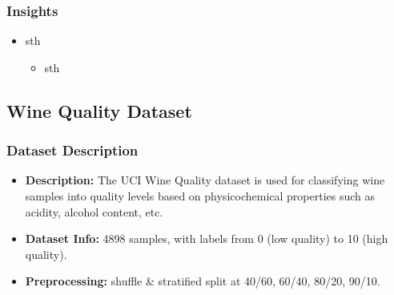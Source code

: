 \clearpage
\subsubsection*{Insights}
\begin{itemize}
	\item sth
	      \begin{itemize}
		      \item sth
	      \end{itemize}
\end{itemize}

\clearpage
\subsection{Wine Quality Dataset}
\subsubsection*{Dataset Description}
\begin{itemize}
	\item \textbf{Description:} The UCI Wine Quality dataset is used for classifying wine samples into quality levels based on physicochemical properties such as acidity, alcohol content, etc.
	\item \textbf{Dataset Info:} 4898 samples, with labels from 0 (low quality) to 10 (high quality).
	\item \textbf{Preprocessing:} shuffle \& stratified split at 40/60, 60/40, 80/20, 90/10.
\end{itemize}

